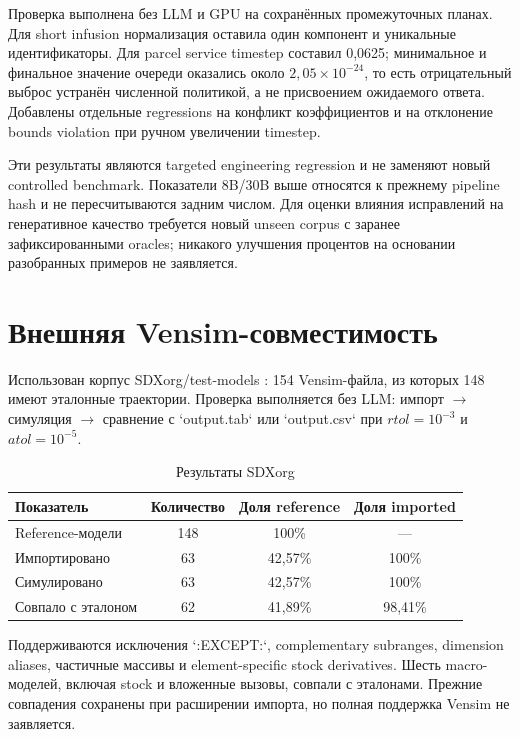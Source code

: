 Проверка выполнена без LLM и GPU на сохранённых промежуточных планах. Для short infusion нормализация оставила один компонент и уникальные идентификаторы. Для parcel service timestep составил 0,0625; минимальное и финальное значение очереди оказались около $2{,}05\times10^{-24}$, то есть отрицательный выброс устранён численной политикой, а не присвоением ожидаемого ответа. Добавлены отдельные regressions на конфликт коэффициентов и на отклонение bounds violation при ручном увеличении timestep.

Эти результаты являются targeted engineering regression и не заменяют новый controlled benchmark. Показатели 8B/30B выше относятся к прежнему pipeline hash и не пересчитываются задним числом. Для оценки влияния исправлений на генеративное качество требуется новый unseen corpus с заранее зафиксированными oracles; никакого улучшения процентов на основании разобранных примеров не заявляется.

\section{Внешняя Vensim-совместимость}

Использован корпус SDXorg/test-models \cite{sdxorg_test_models}: 154 Vensim-файла, из которых 148 имеют эталонные траектории. Проверка выполняется без LLM: импорт $\rightarrow$ симуляция $\rightarrow$ сравнение с `output.tab` или `output.csv` при $rtol=10^{-3}$ и $atol=10^{-5}$.

\begin{table}[H]
    \centering
    \caption{Результаты SDXorg}
    \label{tab:sdxorg-results}
    \small
    \begin{tabular}{lccc}
        \toprule
        Показатель & Количество & Доля reference & Доля imported \\
        \midrule
        Reference-модели & 148 & 100\% & --- \\
        Импортировано & 63 & 42,57\% & 100\% \\
        Симулировано & 63 & 42,57\% & 100\% \\
        Совпало с эталоном & 62 & 41,89\% & 98,41\% \\
        \bottomrule
    \end{tabular}
\end{table}

Поддерживаются исключения `:EXCEPT:`, complementary subranges, dimension aliases, частичные массивы и element-specific stock derivatives. Шесть macro-моделей, включая stock и вложенные вызовы, совпали с эталонами. Прежние совпадения сохранены при расширении импорта, но полная поддержка Vensim не заявляется.

